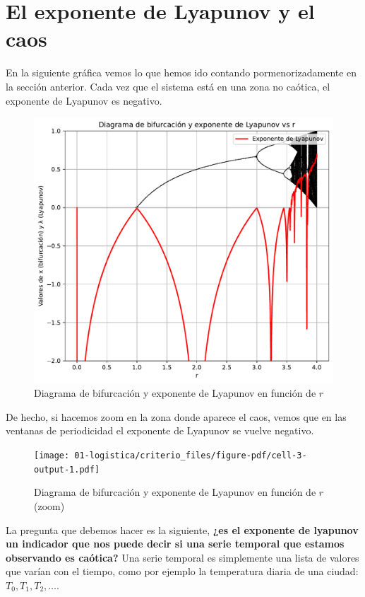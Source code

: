\documentclass[
  10pt,
  a4paper,
  DIV=11,
  numbers=noendperiod,
  open=any]{scrreprt}
\numberwithin{equation}{chapter}
\numberwithin{equation}{section}
\renewcommand{\[}{\begin{equation}}
\renewcommand{\]}{\end{equation}}
\begin{document}
\chapter{El exponente de Lyapunov y el
caos}\label{el-exponente-de-lyapunov-y-el-caos}

En la siguiente gráfica vemos lo que hemos ido contando
pormenorizadamente en la sección anterior. Cada vez que el sistema está
en una zona no caótica, el exponente de Lyapunov es negativo.

\begin{figure}[h]
  \centering
  \includegraphics[keepaspectratio]{01-logistica/criterio_files/figure-pdf/cell-2-output-1.pdf}
  \caption{Diagrama de bifurcación y exponente de Lyapunov en función de $r$}
\end{figure}


De hecho, si hacemos zoom en la zona donde aparece el caos, vemos que en
las ventanas de periodicidad el exponente de Lyapunov se vuelve
negativo.

\begin{figure}[h]
  \centering
  \texttt{[image: 01-logistica/criterio\_files/figure-pdf/cell-3-output-1.pdf]}
  \caption{Diagrama de bifurcación y exponente de Lyapunov en función de $r$ (zoom)}
\end{figure}



La pregunta que debemos hacer es la siguiente, \textbf{¿es el exponente
de lyapunov un indicador que nos puede decir si una serie temporal que
estamos observando es caótica?} Una serie temporal es simplemente una
lista de valores que varían con el tiempo, como por ejemplo la
temperatura diaria de una ciudad: \(T_0, T_1, T_2, \dots\).
\end{document}
